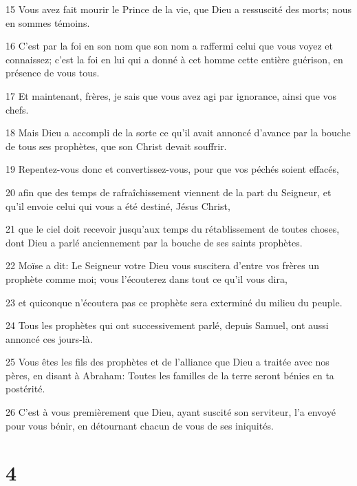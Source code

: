 \par 15 Vous avez fait mourir le Prince de la vie, que Dieu a ressuscité des morts; nous en sommes témoins.
\par 16 C'est par la foi en son nom que son nom a raffermi celui que vous voyez et connaissez; c'est la foi en lui qui a donné à cet homme cette entière guérison, en présence de vous tous.
\par 17 Et maintenant, frères, je sais que vous avez agi par ignorance, ainsi que vos chefs.
\par 18 Mais Dieu a accompli de la sorte ce qu'il avait annoncé d'avance par la bouche de tous ses prophètes, que son Christ devait souffrir.
\par 19 Repentez-vous donc et convertissez-vous, pour que vos péchés soient effacés,
\par 20 afin que des temps de rafraîchissement viennent de la part du Seigneur, et qu'il envoie celui qui vous a été destiné, Jésus Christ,
\par 21 que le ciel doit recevoir jusqu'aux temps du rétablissement de toutes choses, dont Dieu a parlé anciennement par la bouche de ses saints prophètes.
\par 22 Moïse a dit: Le Seigneur votre Dieu vous suscitera d'entre vos frères un prophète comme moi; vous l'écouterez dans tout ce qu'il vous dira,
\par 23 et quiconque n'écoutera pas ce prophète sera exterminé du milieu du peuple.
\par 24 Tous les prophètes qui ont successivement parlé, depuis Samuel, ont aussi annoncé ces jours-là.
\par 25 Vous êtes les fils des prophètes et de l'alliance que Dieu a traitée avec nos pères, en disant à Abraham: Toutes les familles de la terre seront bénies en ta postérité.
\par 26 C'est à vous premièrement que Dieu, ayant suscité son serviteur, l'a envoyé pour vous bénir, en détournant chacun de vous de ses iniquités.

\chapter{4}


